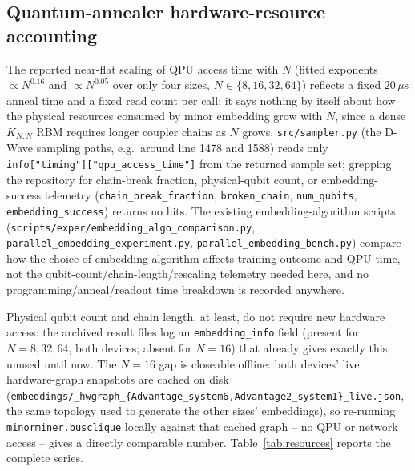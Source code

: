 \subsection{Quantum-annealer hardware-resource accounting}
\label{sec:hw-resources}

The reported near-flat scaling of QPU access time with $N$ (fitted exponents $\propto N^{0.16}$ and $\propto N^{0.05}$ over only four sizes, $N\in\{8,16,32,64\}$) reflects a fixed $20\,\mu\mathrm s$ anneal time and a fixed read count per call; it says nothing by itself about how the physical resources consumed by minor embedding grow with $N$, since a dense $K_{N,N}$ RBM requires longer coupler chains as $N$ grows. \texttt{src/sampler.py} (the D-Wave sampling paths, e.g.\ around line 1478 and 1588) reads only \texttt{info["timing"]["qpu\_access\_time"]} from the returned sample set; grepping the repository for chain-break fraction, physical-qubit count, or embedding-success telemetry (\texttt{chain\_break\_fraction}, \texttt{broken\_chain}, \texttt{num\_qubits}, \texttt{embedding\_success}) returns no hits. The existing embedding-algorithm scripts (\texttt{scripts/exper/embedding\_algo\_comparison.py}, \texttt{parallel\_embedding\_experiment.py}, \texttt{parallel\_embedding\_bench.py}) compare how the choice of embedding algorithm affects training outcome and QPU time, not the qubit-count/chain-length/rescaling telemetry needed here, and no programming/anneal/readout time breakdown is recorded anywhere.

Physical qubit count and chain length, at least, do not require new hardware access: the archived result files log an \texttt{embedding\_info} field (present for $N=8,32,64$, both devices; absent for $N=16$) that already gives exactly this, unused until now. The $N=16$ gap is closeable offline: both devices' live hardware-graph snapshots are cached on disk (\texttt{embeddings/\_hwgraph\_\{Advantage\_system6,Advantage2\_system1\}\_live.json}, the same topology used to generate the other sizes' embeddings), so re-running \texttt{minorminer.busclique} locally against that cached graph -- no QPU or network access -- gives a directly comparable number. Table~\ref{tab:resources} reports the complete series.

